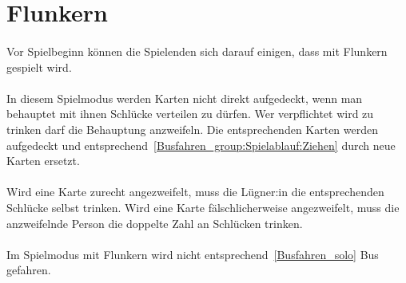 \section{Flunkern}
\paragraph{}
Vor Spielbeginn können die Spielenden sich darauf einigen, dass mit Flunkern gespielt wird.

\paragraph{}
In diesem Spielmodus werden Karten nicht direkt aufgedeckt, wenn man behauptet mit ihnen Schlücke verteilen zu dürfen.
Wer verpflichtet wird zu trinken darf die Behauptung anzweifeln.
Die entsprechenden Karten werden aufgedeckt und entsprechend~\ref{Busfahren_group:Spielablauf:Ziehen} durch neue Karten ersetzt.

\paragraph{}
Wird eine Karte zurecht angezweifelt, muss die Lügner:in die entsprechenden Schlücke selbst trinken.
Wird eine Karte fälschlicherweise angezweifelt, muss die anzweifelnde Person die doppelte Zahl an Schlücken trinken.

\paragraph{}
Im Spielmodus mit Flunkern wird nicht entsprechend~\ref{Busfahren_solo} Bus gefahren.
